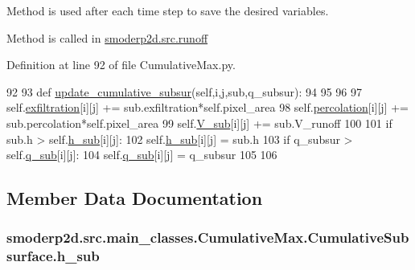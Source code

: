 Method is used after each time step to save the desired variables. 

Method is called in \hyperlink{namespacesmoderp2d_1_1src_1_1runoff}{smoderp2d.\-src.\-runoff} 

Definition at line 92 of file Cumulative\-Max.\-py.


\begin{DoxyCode}
92 
93   \textcolor{keyword}{def }\hyperlink{classsmoderp2d_1_1src_1_1main__classes_1_1CumulativeMax_1_1CumulativeSubsurface_a1cd15ec0c1b0a48ea407bededae616f1}{update\_cumulative\_subsur}(self,i,j,sub,q\_subsur):
94 
95 
96 
97     self.\hyperlink{classsmoderp2d_1_1src_1_1main__classes_1_1CumulativeMax_1_1CumulativeSubsurface_aee3434badacc2f2b65479ec36d1dda2e}{exfiltration}[i][j] += sub.exfiltration*self.pixel\_area
98     self.\hyperlink{classsmoderp2d_1_1src_1_1main__classes_1_1CumulativeMax_1_1CumulativeSubsurface_a806c9b916b109e00cf0ead684d3a9b09}{percolation}[i][j] += sub.percolation*self.pixel\_area
99     self.\hyperlink{classsmoderp2d_1_1src_1_1main__classes_1_1CumulativeMax_1_1CumulativeSubsurface_a3c7067e73cd4eaf3837b80b9eaca2e76}{V\_sub}[i][j] += sub.V\_runoff
100 
101     \textcolor{keywordflow}{if} sub.h > self.\hyperlink{classsmoderp2d_1_1src_1_1main__classes_1_1CumulativeMax_1_1CumulativeSubsurface_a462419afbc95f9536beae247d390fb04}{h\_sub}[i][j]:
102       self.\hyperlink{classsmoderp2d_1_1src_1_1main__classes_1_1CumulativeMax_1_1CumulativeSubsurface_a462419afbc95f9536beae247d390fb04}{h\_sub}[i][j] = sub.h
103     \textcolor{keywordflow}{if} q\_subsur > self.\hyperlink{classsmoderp2d_1_1src_1_1main__classes_1_1CumulativeMax_1_1CumulativeSubsurface_a600cf6abad6728fd5899781e55f13f14}{q\_sub}[i][j]:
104       self.\hyperlink{classsmoderp2d_1_1src_1_1main__classes_1_1CumulativeMax_1_1CumulativeSubsurface_a600cf6abad6728fd5899781e55f13f14}{q\_sub}[i][j] = q\_subsur
105 
106 

\end{DoxyCode}


\subsection{Member Data Documentation}
\hypertarget{classsmoderp2d_1_1src_1_1main__classes_1_1CumulativeMax_1_1CumulativeSubsurface_a462419afbc95f9536beae247d390fb04}{
\subsubsection[{h\-\_\-sub}]{\setlength{\rightskip}{0pt plus 5cm}smoderp2d.\-src.\-main\-\_\-classes.\-Cumulative\-Max.\-Cumulative\-Subsurface.\-h\-\_\-sub}}\label{classsmoderp2d_1_1src_1_1main__classes_1_1CumulativeMax_1_1CumulativeSubsurface_a462419afbc95f9536beae247d390fb04}


